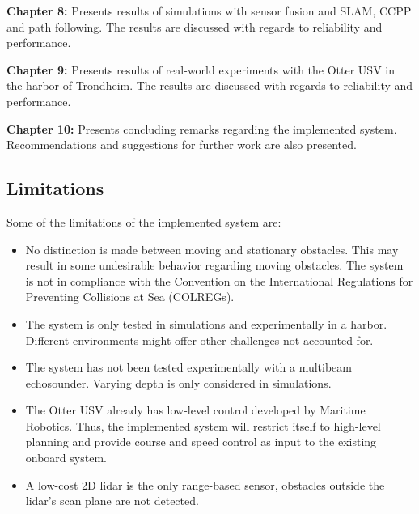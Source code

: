 \noindent \textbf{Chapter 8:} Presents results of simulations with sensor fusion and SLAM, CCPP and path following. The results are discussed with regards to reliability and performance.
\vspace{0.4em}

\noindent \textbf{Chapter 9:} Presents results of real-world experiments with the Otter USV in the harbor of Trondheim. The results are discussed with regards to reliability and performance.
\vspace{0.4em}

\noindent \textbf{Chapter 10:} Presents concluding remarks regarding the implemented system. Recommendations and suggestions for further work are also presented.
\vspace{0.4em}

\subsection{Limitations}

Some of the limitations of the implemented system are:

\begin{itemize}

\item No distinction is made between moving and stationary obstacles. This may result in some undesirable behavior regarding moving obstacles. The system is not in compliance with the Convention on the International Regulations for Preventing Collisions at Sea (COLREGs).

\item The system is only tested in simulations and experimentally in a harbor. Different environments might offer other challenges not accounted for.

\item The system has not been tested experimentally with a multibeam echosounder. Varying depth is only considered in simulations.

\item The Otter USV already has low-level control developed by Maritime Robotics. Thus, the implemented system will restrict itself to high-level planning and provide course and speed control as input to the existing onboard system.

\item A low-cost 2D lidar is the only range-based sensor, obstacles outside the lidar's scan plane are not detected.

\end{itemize}

